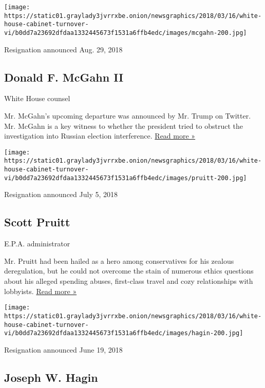 \texttt{[image: https://static01.graylady3jvrrxbe.onion/newsgraphics/2018/03/16/white-house-cabinet-turnover-vi/b0dd7a23692dfdaa1332445673f1531a6ffb4edc/images/mcgahn-200.jpg]}

Resignation announced Aug. 29, 2018

\hypertarget{donald-f-mcgahn-ii}{%
\subsection{Donald F. McGahn II}\label{donald-f-mcgahn-ii}}

White House counsel

Mr. McGahn's upcoming departure was announced by Mr. Trump on Twitter.
Mr. McGahn is a key witness to whether the president tried to obstruct
the investigation into Russian election interference.
\href{https://www.nytimes3xbfgragh.onion/2018/08/29/us/politics/don-mcgahn-white-house-counsel-trump.html?action=click\&module=Top\%20Stories\&pgtype=Homepage}{Read
more »}

\texttt{[image: https://static01.graylady3jvrrxbe.onion/newsgraphics/2018/03/16/white-house-cabinet-turnover-vi/b0dd7a23692dfdaa1332445673f1531a6ffb4edc/images/pruitt-200.jpg]}

Resignation announced July 5, 2018

\hypertarget{scott-pruitt}{%
\subsection{Scott Pruitt}\label{scott-pruitt}}

E.P.A. administrator

Mr. Pruitt had been hailed as a hero among conservatives for his zealous
deregulation, but he could not overcome the stain of numerous ethics
questions about his alleged spending abuses, first-class travel and cozy
relationships with lobbyists.
\href{https://www.nytimes3xbfgragh.onion/2018/07/05/climate/scott-pruitt-epa-trump.html?action=Click\&contentCollection=BreakingNews\&contentID=67259369\&pgtype=Homepage}{Read
more »}

\texttt{[image: https://static01.graylady3jvrrxbe.onion/newsgraphics/2018/03/16/white-house-cabinet-turnover-vi/b0dd7a23692dfdaa1332445673f1531a6ffb4edc/images/hagin-200.jpg]}

Resignation announced June 19, 2018

\hypertarget{joseph-w-hagin}{%
\subsection{Joseph W. Hagin}\label{joseph-w-hagin}}

